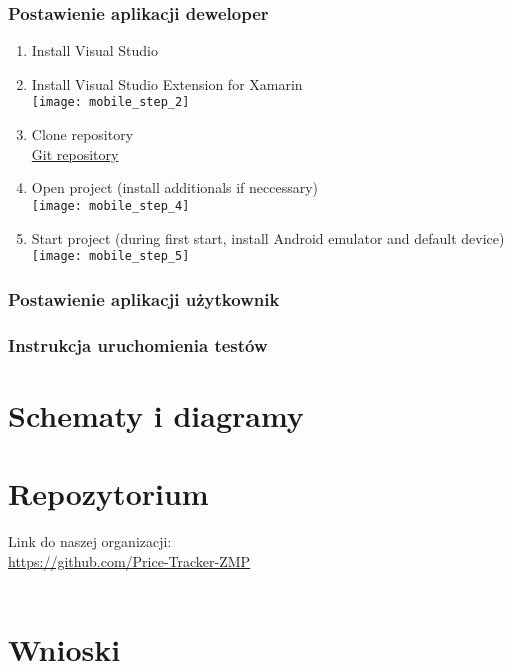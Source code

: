 \documentclass{article}
\begin{document}
        \subsubsection{Postawienie aplikacji deweloper}
         \begin{enumerate}
            \item Install Visual Studio\\
            \item Install Visual Studio Extension for Xamarin\\
                \texttt{[image: mobile\_step\_2]}\\
            \item Clone repository\\
            \href{https://github.com/Price-Tracker-ZMP/Mobile.git}{Git repository}\\
            \item Open project (install additionals if neccessary)\\
                \texttt{[image: mobile\_step\_4]}\\
            \item Start project (during first start, install Android emulator and default device)\\
                \texttt{[image: mobile\_step\_5]}\\
        \end{enumerate}
       
        \subsubsection{Postawienie aplikacji użytkownik}
        
        \subsubsection{Instrukcja uruchomienia testów}

\section{Schematy i diagramy}

\section{Repozytorium}
Link do naszej organizacji: \\
\url{https://github.com/Price-Tracker-ZMP}\\\\

\section{Wnioski}
\end{document}
